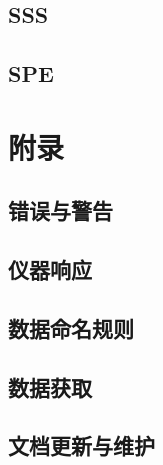 \chapter{SSS}





















\chapter{SPE}












\part{附录}
\appendix
\chapter{错误与警告}







\chapter{仪器响应}
\label{chap:resp}




\chapter{数据命名规则}
\label{chap:naming}


\chapter{数据获取}



\chapter{文档更新与维护}
\label{chap:doc-maintenance}







